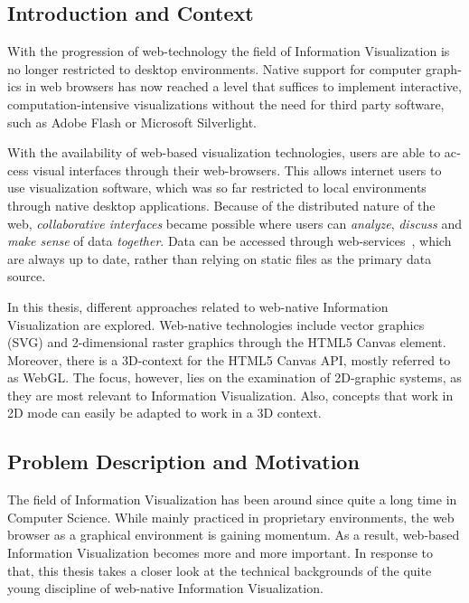 \begin{english}
\chapter{Introduction and Context}
\label{cha:introduction}

With the progression of web-technology the field of Information Visualization is no longer restricted to desktop environments. Native support for computer graphics in web browsers has now reached a level that suffices to implement interactive, computation-intensive visualizations without the need for third party software, such as Adobe Flash or Microsoft Silverlight.

With the availability of web-based visualization technologies, users are able to access visual interfaces through their web-browsers. This allows internet users to use visualization software, which was so far restricted to local environments through native desktop applications. Because of the distributed nature of the web, \emph{collaborative interfaces} became possible where users can \emph{analyze}, \emph{discuss} and \emph{make sense} of data \emph{together}. Data can be accessed through web-services~\cite{Fielding_2000}, which are always up to date, rather than relying on static files as the primary data source.

In this thesis, different approaches related to web-native Information Visualization are explored. Web-native technologies include vector graphics (SVG) and 2-dimensional raster graphics through the HTML5 Canvas element. Moreover, there is a 3D-context for the HTML5 Canvas API, mostly referred to as WebGL. The focus, however, lies on the examination of 2D-graphic systems, as they are most relevant to Information Visualization. Also, concepts that work in 2D mode can easily be adapted to work in a 3D context.


\section{Problem Description and Motivation}

The field of Information Visualization has been around since quite a long time in Computer Science. While mainly practiced in proprietary environments, the web browser as a graphical environment is gaining momentum. As a result, web-based Information Visualization becomes more and more important. In response to that, this thesis takes a closer look at the technical backgrounds of the quite young discipline of web-native Information Visualization.


\end{english}
